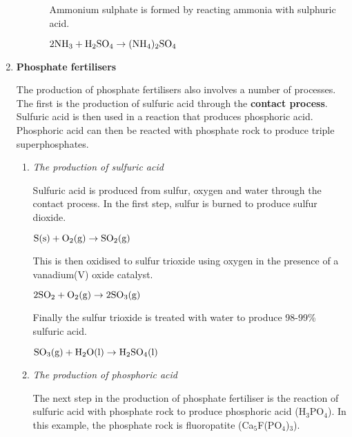 \begin{enumerate}
\begin{enumerate}
\begin{itemize}
{Ammonium sulphate is formed by reacting ammonia with sulphuric acid.

\begin{center}
$\rm{2NH_{3} + H_{2}SO_{4} \rightarrow (NH_{4})_{2}SO_{4}}$
\end{center}

}
\end{itemize}
 
	\end{enumerate}

\item{\textbf{Phosphate fertilisers}}

The production of phosphate fertilisers also involves a number of processes. The first is the production of sulfuric acid through the \textbf{contact process}. Sulfuric acid is then used in a reaction that produces phosphoric acid. Phosphoric acid can then be reacted with phosphate rock to produce triple superphosphates. 

	\begin{enumerate}
\item{\textit{The production of sulfuric acid}}

Sulfuric acid is produced from sulfur, oxygen and water through the contact process. In the first step, sulfur is burned to produce sulfur dioxide.

\begin{center}
$\rm{S(s) + O_{2}(g) \rightarrow SO_{2}(g)}$
\end{center}
 
This is then oxidised to sulfur trioxide using oxygen in the presence of a vanadium(V) oxide catalyst.

\begin{center}
$\rm{2SO_{2} + O_{2}(g) \rightarrow 2SO_{3}(g)}$
\end{center} 

Finally the sulfur trioxide is treated with water to produce 98-99\% sulfuric acid.

\begin{center}
$\rm{SO_{3}(g) + H_{2}O(l) \rightarrow H_{2}SO_{4}(l)}$
\end{center}

\item{\textit{The production of phosphoric acid}}

The next step in the production of phosphate fertiliser is the reaction of sulfuric acid with phosphate rock to produce phosphoric acid (H$_{3}$PO$_{4}$). In this example, the phosphate rock is fluoropatite (Ca$_{5}$F(PO$_{4}$)$_{3}$). 


\end{enumerate}
\end{enumerate}
